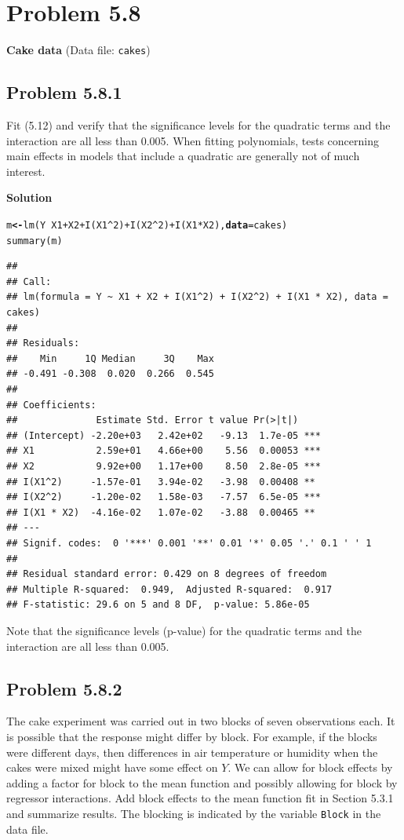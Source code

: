 \documentclass[12pt,oneside,a4paper]{article}\usepackage[]{graphicx}\usepackage[]{xcolor}
\makeatletter
\newcommand{\hlnum}[1]{\textcolor[rgb]{0,0,0}{#1}}%
\newcommand{\hlopt}[1]{\textcolor[rgb]{0,0,0}{#1}}%
\newcommand{\hlstd}[1]{\textcolor[rgb]{0,0,0}{#1}}%
\newcommand{\hlkwb}[1]{\textcolor[rgb]{0.498,0,0.333}{\textbf{#1}}}%
\newcommand{\hlkwc}[1]{\textcolor[rgb]{0.498,0,0.333}{\textbf{#1}}}%
\newcommand{\hlkwd}[1]{\textcolor[rgb]{0,0,0}{#1}}%
\newenvironment{kframe}{%
 \def\at@end@of@kframe{}%
 \ifinner\ifhmode%
  \def\at@end@of@kframe{\end{minipage}}%
  \begin{minipage}{\columnwidth}%
 \fi\fi%
 \def\FrameCommand##1{\hskip\@totalleftmargin \hskip-\fboxsep
 \colorbox{shadecolor}{##1}\hskip-\fboxsep
     \hskip-\linewidth \hskip-\@totalleftmargin \hskip\columnwidth}%
 \MakeFramed {\advance\hsize-\width
   \@totalleftmargin\z@ \linewidth\hsize
   \@setminipage}}%
 {\par\unskip\endMakeFramed%
 \at@end@of@kframe}
\newenvironment{knitrout}{}{} %
\newcommand{\problem}[1]
{
    \clearpage
    \section*{Problem {#1}}
}
\newcommand{\subproblem}[1]
{
    \subsection*{Problem {#1}}
}
\newcommand{\solution}
{
    \vspace{15pt}
    \noindent\ignorespaces\textbf{\large Solution}
}
\newcommand{\m}[1]{\texttt{{#1}}}
\makeatother
\begin{document}
\problem{5.8}
\textbf{Cake data} (Data file: \m{cakes})

\subproblem{5.8.1}
Fit (5.12) and verify that the significance levels for the quadratic terms and the interaction are all less than 0.005. When fitting polynomials, tests concerning main effects in models that include a quadratic are generally not of much interest.

\solution
\begin{knitrout}
\color{fgcolor}\begin{kframe}
\begin{alltt}
\hlstd{m} \hlkwb{<-} \hlkwd{lm}\hlstd{(Y} \hlopt{~} \hlstd{X1} \hlopt{+} \hlstd{X2} \hlopt{+} \hlkwd{I}\hlstd{(X1}\hlopt{^}\hlnum{2}\hlstd{)} \hlopt{+} \hlkwd{I}\hlstd{(X2}\hlopt{^}\hlnum{2}\hlstd{)} \hlopt{+} \hlkwd{I}\hlstd{(X1}\hlopt{*}\hlstd{X2),} \hlkwc{data} \hlstd{= cakes)}
\hlkwd{summary}\hlstd{(m)}
\end{alltt}
\begin{verbatim}
## 
## Call:
## lm(formula = Y ~ X1 + X2 + I(X1^2) + I(X2^2) + I(X1 * X2), data = cakes)
## 
## Residuals:
##    Min     1Q Median     3Q    Max 
## -0.491 -0.308  0.020  0.266  0.545 
## 
## Coefficients:
##              Estimate Std. Error t value Pr(>|t|)    
## (Intercept) -2.20e+03   2.42e+02   -9.13  1.7e-05 ***
## X1           2.59e+01   4.66e+00    5.56  0.00053 ***
## X2           9.92e+00   1.17e+00    8.50  2.8e-05 ***
## I(X1^2)     -1.57e-01   3.94e-02   -3.98  0.00408 ** 
## I(X2^2)     -1.20e-02   1.58e-03   -7.57  6.5e-05 ***
## I(X1 * X2)  -4.16e-02   1.07e-02   -3.88  0.00465 ** 
## ---
## Signif. codes:  0 '***' 0.001 '**' 0.01 '*' 0.05 '.' 0.1 ' ' 1
## 
## Residual standard error: 0.429 on 8 degrees of freedom
## Multiple R-squared:  0.949,	Adjusted R-squared:  0.917 
## F-statistic: 29.6 on 5 and 8 DF,  p-value: 5.86e-05
\end{verbatim}
\end{kframe}
\end{knitrout}

Note that the significance levels (p-value) for the quadratic terms and the interaction are all less than 0.005.

\subproblem{5.8.2}
The cake experiment was carried out in two blocks of seven observations each. It is possible that the response might differ by block. For example, if the blocks were different days, then differences in air temperature or humidity when the cakes were mixed might have some effect on $Y$. We can allow for block effects by adding a factor for block to the mean function and possibly allowing for block by regressor interactions. Add block effects to the mean function fit in Section 5.3.1 and summarize results. The blocking is indicated by the variable \m{Block} in the data file.
\end{document}
